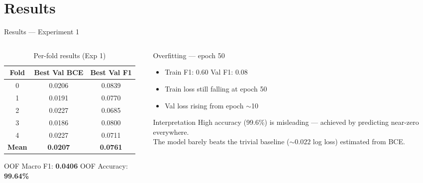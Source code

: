 \documentclass[aspectratio=169, 10pt]{beamer}
\begin{document}
\section{Results}

\begin{frame}{Results — Experiment 1}
  \begin{columns}[T]
    \begin{column}{0.5\textwidth}
      \begin{table}
        \caption{Per-fold results (Exp 1)}
        \small
        \begin{tabular}{ccc}
          \toprule
          \textbf{Fold} & \textbf{Best Val BCE} & \textbf{Best Val F1} \\
          \midrule
          0 & 0.0206 & 0.0839 \\
          1 & 0.0191 & 0.0770 \\
          2 & 0.0227 & 0.0685 \\
          3 & 0.0186 & 0.0800 \\
          4 & 0.0227 & 0.0711 \\
          \midrule
          \textbf{Mean} & \textbf{0.0207} & \textbf{0.0761} \\
          \bottomrule
        \end{tabular}
      \end{table}
      \vspace{0.3em}
      OOF Macro F1: \textbf{0.0406} \quad OOF Accuracy: \textbf{99.64\%}
    \end{column}
    \begin{column}{0.46\textwidth}
      \begin{alertblock}{Overfitting — epoch 50}
        \begin{itemize}
          \item Train F1: $\mathbf{0.60}$ \quad Val F1: $\mathbf{0.08}$
          \item Train loss still falling at epoch 50
          \item Val loss rising from epoch $\sim$10
        \end{itemize}
      \end{alertblock}
      \vspace{0.4em}
      \begin{exampleblock}{Interpretation}
        High accuracy (99.6\%) is misleading —
        achieved by predicting near-zero everywhere.\\[0.3em]
        The model barely beats the trivial baseline
        ($\sim 0.022$ log loss) estimated from BCE.
      \end{exampleblock}
    \end{column}
  \end{columns}
\end{frame}
\end{document}
